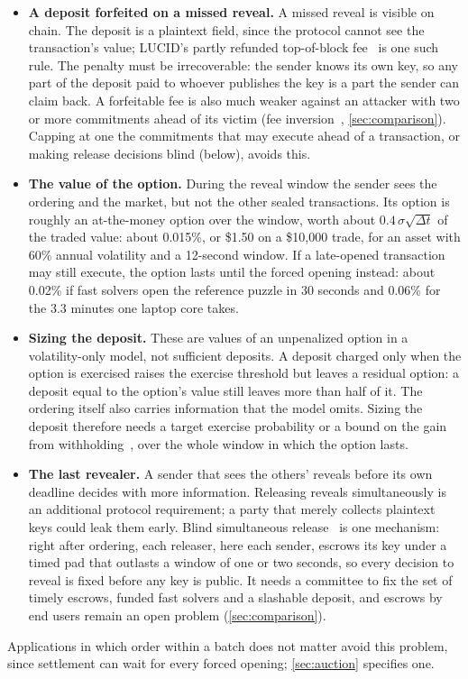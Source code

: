 \begin{itemize}[leftmargin=1.5em]
  \item \textbf{A deposit forfeited on a missed reveal.} A missed reveal is visible on chain. The deposit is a plaintext field, since the protocol cannot see the transaction's value; LUCID's partly refunded top-of-block fee~\cite{LUCID} is one such rule. The penalty must be irrecoverable: the sender knows its own key, so any part of the deposit paid to whoever publishes the key is a part the sender can claim back. A forfeitable fee is also much weaker against an attacker with two or more commitments ahead of its victim (fee inversion~\cite{Naraghi26}, \cref{sec:comparison}). Capping at one the commitments that may execute ahead of a transaction, or making release decisions blind (below), avoids this.
  \item \textbf{The value of the option.} During the reveal window the sender sees the ordering and the market, but not the other sealed transactions. Its option is roughly an at-the-money option over the window, worth about $0.4\,\sigma\sqrt{\Delta t}$ of the traded value: about 0.015\%, or \$1.50 on a \$10,000 trade, for an asset with 60\% annual volatility and a 12-second window. If a late-opened transaction may still execute, the option lasts until the forced opening instead: about 0.02\% if fast solvers open the reference puzzle in 30 seconds and 0.06\% for the 3.3 minutes one laptop core takes.
  \item \textbf{Sizing the deposit.} These are values of an unpenalized option in a volatility-only model, not sufficient deposits. A deposit charged only when the option is exercised raises the exercise threshold but leaves a residual option: a deposit equal to the option's value still leaves more than half of it. The ordering itself also carries information that the model omits. Sizing the deposit therefore needs a target exercise probability or a bound on the gain from withholding~\cite{Naraghi26}, over the whole window in which the option lasts.
  \item \textbf{The last revealer.} A sender that sees the others' reveals before its own deadline decides with more information. Releasing reveals simultaneously is an additional protocol requirement; a party that merely collects plaintext keys could leak them early. Blind simultaneous release~\cite{Naraghi26} is one mechanism: right after ordering, each releaser, here each sender, escrows its key under a timed pad that outlasts a window of one or two seconds, so every decision to reveal is fixed before any key is public. It needs a committee to fix the set of timely escrows, funded fast solvers and a slashable deposit, and escrows by end users remain an open problem (\cref{sec:comparison}).
\end{itemize}
Applications in which order within a batch does not matter avoid this problem, since settlement can wait for every forced opening; \cref{sec:auction} specifies one.

